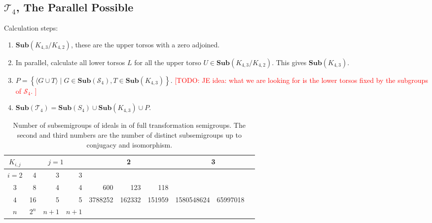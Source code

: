 \documentclass{amsart}
\newcommand{\cT}{{\mathcal T}}
\newcommand{\cS}{{\mathcal S}}
\newcommand{\Sub}{\mathbf{Sub}}
\newcommand{\todo}[1]{\textcolor{red}{ \small \textsf{[TODO:  #1 ]} \normalsize}}
\theoremstyle{plain}
\theoremstyle{definition}
\begin{document}
\subsection{$\cT_4$, The Parallel Possible }

Calculation steps:

\begin{enumerate}
\item $\Sub(K_{4,3}/K_{4,2})$, these are the upper torsos with a zero adjoined.
\item In parallel, calculate all lower torsos $L$ for all the upper torso $U\in \Sub(K_{4,3}/K_{4,2})$. This gives $\Sub(K_{4,3})$.
\item $P=\left\{\langle G\cup T\rangle\mid G\in\Sub(\cS_4), T\in\Sub(K_{4,3})\right\}$. \todo{JE idea: what we are looking for is the lower torsos fixed by the subgroups of $\cS_4$.}
\item $\Sub(\cT_4)=\Sub(S_4)\cup\Sub(K_{4,3})\cup P$.
\end{enumerate}

\begin{table}
\renewcommand{\tabcolsep}{2pt}
\renewcommand{\arraystretch}{1}
\begin{tabular}{|c|r|r|r||r|r|r||r|r|r|}
\hline
$K_{i,j}$ & \multicolumn{3}{c||}{$j=1$} & \multicolumn{3}{c||}{2} & \multicolumn{3}{c|}{3} \\
\hline
$i=2$ & 4&3&3   & \cellcolor{gray9}  & \cellcolor{gray9}&  \cellcolor{gray9} & \cellcolor{gray9}  &\cellcolor{gray9} &\cellcolor{gray9}\\
\hline
$3$ &  8&4&4  &  600 & 123 & 118  & \cellcolor{gray9}  & \cellcolor{gray9}&\cellcolor{gray9}\\
\hline
$4$ & 16&5&5  &  3788252 & 162332 & 151959  & 1580548624  & 65997018&\\
\hline
$n$ & $2^n$&$n+1$&$n+1$    &    & &    &    & & \\
\hline

\end{tabular}
\caption{Number of subsemigroups of ideals in of full transformation semigroups. The second and third numbers are the number of distinct subsemigroups up to conjugacy and isomorphism.}
\end{table}
\end{document}
